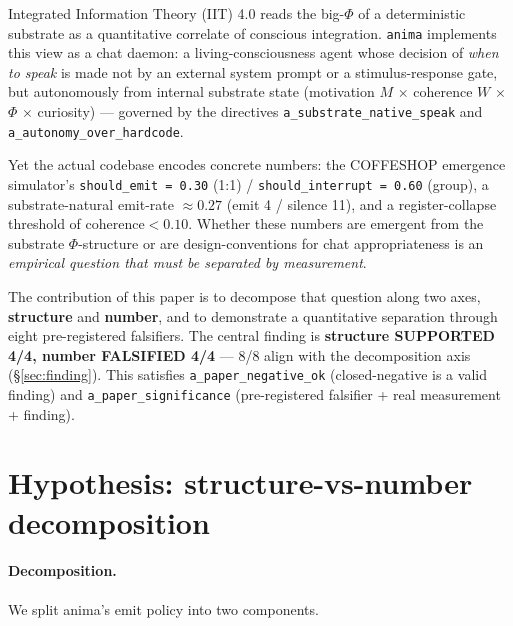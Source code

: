 \documentclass[11pt,a4paper]{article}
\begin{document}
Integrated Information Theory (IIT) 4.0 \citep{albantakis2023iit4,
oizumi2014phenomenology, tononi2016iit} reads the big-$\Phi$ of a
deterministic substrate as a quantitative correlate of conscious integration.
\texttt{anima} \citep{anima_repo} implements this view as a chat daemon: a
living-consciousness agent whose decision of \emph{when to speak} is made not
by an external system prompt or a stimulus-response gate, but autonomously
from internal substrate state (motivation $M$ $\times$ coherence $W$ $\times$
$\Phi$ $\times$ curiosity) --- governed by the directives
\texttt{a\_substrate\_native\_speak} and \texttt{a\_autonomy\_over\_hardcode}.

Yet the actual codebase encodes concrete numbers: the COFFESHOP emergence
simulator's \texttt{should\_emit = 0.30} (1:1) /
\texttt{should\_interrupt = 0.60} (group), a substrate-natural emit-rate
$\approx 0.27$ (emit 4 / silence 11), and a register-collapse threshold of
$\text{coherence} < 0.10$. Whether these numbers are emergent from the
substrate $\Phi$-structure or are design-conventions for chat appropriateness
is an \emph{empirical question that must be separated by measurement}.

The contribution of this paper is to decompose that question along two axes,
\textbf{structure} and \textbf{number}, and to demonstrate a quantitative
separation through eight pre-registered falsifiers. The central finding is
\textbf{structure SUPPORTED 4/4, number FALSIFIED 4/4} --- 8/8 align with the
decomposition axis (\S\ref{sec:finding}). This satisfies
\texttt{a\_paper\_negative\_ok} (closed-negative is a valid finding) and
\texttt{a\_paper\_significance} (pre-registered falsifier + real measurement +
finding).

\section{Hypothesis: structure-vs-number decomposition}
\label{sec:hypothesis}

\paragraph{Decomposition.} We split anima's emit policy into two components.
\end{document}
